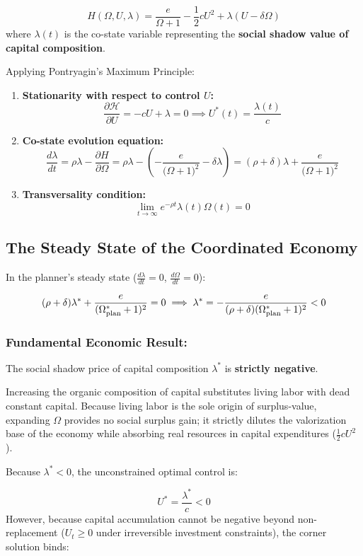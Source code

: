 \documentclass[11pt,letterpaper]{report}
\newcommand{\fitmath}[1]{\begingroup\setbox0=\hbox{$\displaystyle #1$}\ifdim\wd0>\linewidth\resizebox{\linewidth}{!}{$\displaystyle #1$}\else\displaystyle #1\fi\endgroup}
\begin{document}
\[
H(\Omega ,U,\lambda )=\frac{e}{\Omega +1}-\frac{1}{2}c{U}^{2}+\lambda (U-\delta \Omega )
\]
where $\lambda (t)$ is the co-state variable representing the \textbf{social shadow value of capital composition}.

Applying Pontryagin's Maximum Principle:

\begin{enumerate}
\item \textbf{Stationarity with respect to control $U$:}
\[\frac{\partial \mathcal{H}}{\partial U} = - c U + \lambda = 0 \implies U^*(t) = \frac{\lambda(t)}{c}\]
\item \textbf{Co-state evolution equation:}
\[
\frac{d\lambda }{dt}=\rho \lambda -\frac{\partial H}{\partial \Omega }=\rho \lambda -\left({-\frac{e}{(\Omega +1{)}^{2}}-\delta \lambda }\right)=(\rho +\delta )\lambda +\frac{e}{(\Omega +1{)}^{2}}
\]
\item \textbf{Transversality condition:}
\[
\lim\limits_{{t} \rightarrow {\infty }}{e}^{-\rho t}\lambda (t)\Omega (t)=0
\]
\end{enumerate}
\subsection{The Steady State of the Coordinated Economy}
In the planner's steady state ($\frac{d\lambda }{dt}=0$, $\frac{d\Omega }{dt}=0$):

\[\fitmath{(\rho + \delta)\lambda^* + \frac{e}{(\Omega_{\text{plan}}^* + 1)^2} = 0 \implies \lambda^* = -\frac{e}{(\rho + \delta)(\Omega_{\text{plan}}^* + 1)^2} < 0}\]
\subsubsection{Fundamental Economic Result:}
The social shadow price of capital composition ${\lambda }^{*}$ is \textbf{strictly negative}.

Increasing the organic composition of capital substitutes living labor with dead constant capital. Because living labor is the sole origin of surplus-value, expanding $\Omega$ provides no social surplus gain; it strictly dilutes the valorization base of the economy while absorbing real resources in capital expenditures ($\frac{1}{2}c{U}^{2}$).

Because ${\lambda }^{*}<0$, the unconstrained optimal control is:

\[
{U}^{*}=\frac{{\lambda }^{*}}{c}<0
\]
However, because capital accumulation cannot be negative beyond non-replacement (${U}_{t}\geq 0$ under irreversible investment constraints), the corner solution binds:
\end{document}
